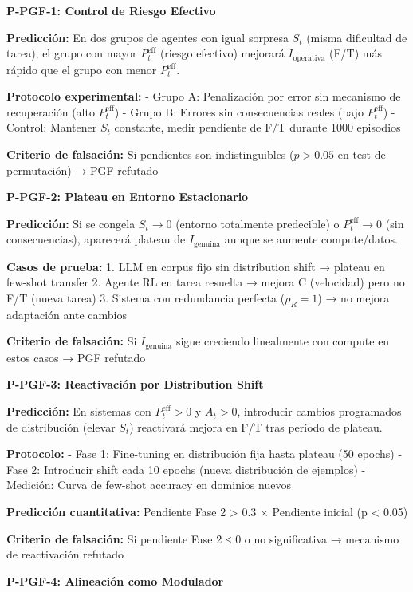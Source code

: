 \textbf{P-PGF-1: Control de Riesgo Efectivo}

\textbf{Predicción:} En dos grupos de agentes con igual sorpresa \(S_t\)
(misma dificultad de tarea), el grupo con mayor \(P^{\text{eff}}_t\)
(riesgo efectivo) mejorará \(I_{\text{operativa}}\) (F/T) más rápido que
el grupo con menor \(P^{\text{eff}}_t\).

\textbf{Protocolo experimental:} - Grupo A: Penalización por error sin
mecanismo de recuperación (alto \(P^{\text{eff}}_t\)) - Grupo B: Errores
sin consecuencias reales (bajo \(P^{\text{eff}}_t\)) - Control: Mantener
\(S_t\) constante, medir pendiente de F/T durante 1000 episodios

\textbf{Criterio de falsación:} Si pendientes son indistinguibles
(\(p > 0.05\) en test de permutación) → PGF refutado

\textbf{P-PGF-2: Plateau en Entorno Estacionario}

\textbf{Predicción:} Si se congela \(S_t \to 0\) (entorno totalmente
predecible) o \(P^{\text{eff}}_t \to 0\) (sin consecuencias), aparecerá
plateau de \(I_{\text{genuina}}\) aunque se aumente compute/datos.

\textbf{Casos de prueba:} 1. LLM en corpus fijo sin distribution shift →
plateau en few-shot transfer 2. Agente RL en tarea resuelta → mejora C
(velocidad) pero no F/T (nueva tarea) 3. Sistema con redundancia
perfecta (\(\rho_R = 1\)) → no mejora adaptación ante cambios

\textbf{Criterio de falsación:} Si \(I_{\text{genuina}}\) sigue
creciendo linealmente con compute en estos casos → PGF refutado

\textbf{P-PGF-3: Reactivación por Distribution Shift}

\textbf{Predicción:} En sistemas con \(P^{\text{eff}}_t > 0\) y
\(A_t > 0\), introducir cambios programados de distribución (elevar
\(S_t\)) reactivará mejora en F/T tras período de plateau.

\textbf{Protocolo:} - Fase 1: Fine-tuning en distribución fija hasta
plateau (50 epochs) - Fase 2: Introducir shift cada 10 epochs (nueva
distribución de ejemplos) - Medición: Curva de few-shot accuracy en
dominios nuevos

\textbf{Predicción cuantitativa:} Pendiente Fase 2 \textgreater{} 0.3 ×
Pendiente inicial (p \textless{} 0.05)

\textbf{Criterio de falsación:} Si pendiente Fase 2 ≤ 0 o no
significativa → mecanismo de reactivación refutado

\textbf{P-PGF-4: Alineación como Modulador}

